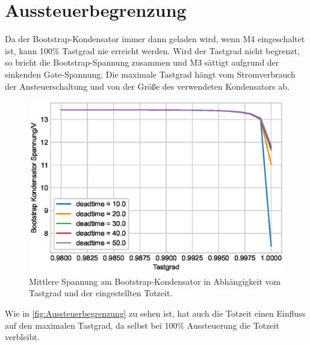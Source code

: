 \section{Aussteuerbegrenzung}
Da der Bootstrap-Kondensator immer dann geladen wird, wenn M4 eingeschaltet ist, kann 100\% Tastgrad nie erreicht werden. Wird der Tastgrad nicht begrenzt, so bricht die Bootstrap-Spannung zusammen und M3 sättigt aufgrund der sinkenden Gate-Spannung.
Die maximale Tastgrad hängt vom Stromverbrauch der Ansteuerschaltung und von der Größe des verwendeten Kondensators ab.
\begin{figure}
    \centering
    \includegraphics{Bilder/Aussteuerbegrenzung.eps}
    \caption{Mittlere Spannung am Bootstrap-Kondensator in Abhängigkeit vom Tastgrad und der eingestellten Totzeit.}
    \label{fig:Aussteuerbegrenzung}
\end{figure}
Wie in \autoref{fig:Aussteuerbegrenzung} zu sehen ist, hat auch die Totzeit einen Einfluss auf den maximalen Tastgrad, da selbst bei 100\% Aussteuerung die Totzeit verbleibt.


\FloatBarrier
\clearpage
